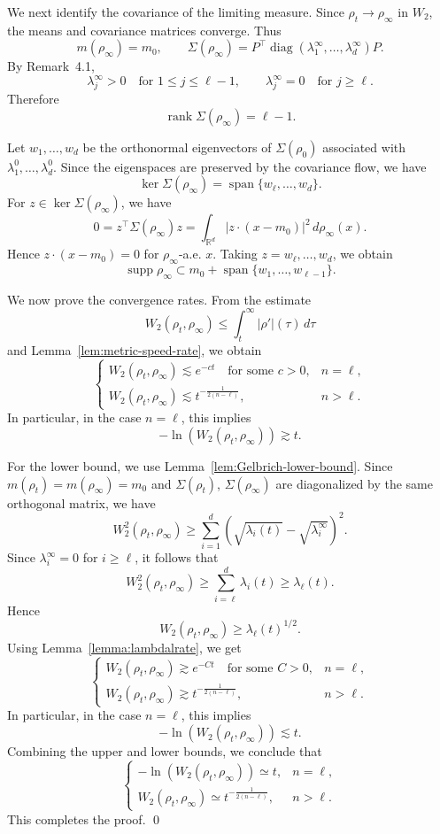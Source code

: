 \documentclass[11pt,reqno]{amsart}
\numberwithin{figure}{section}
\begin{document}
We next identify the covariance of the limiting measure. Since \(\rho_t\to\rho_\infty\)
in \(W_2\), the means and covariance matrices converge. Thus
\[
m(\rho_\infty)=m_0,
\qquad
\Sigma(\rho_\infty)
=
P^\top
\operatorname{diag}(\lambda_1^\infty,\dots,\lambda_d^\infty)P.
\]
By Remark~4.1,
\[
\lambda_j^\infty>0 \quad\text{for }1\le j\le \ell-1,
\qquad
\lambda_j^\infty=0 \quad\text{for }j\ge \ell.
\]
Therefore
\[
\operatorname{rank}\Sigma(\rho_\infty)=\ell-1.
\]

Let \(w_1,\dots,w_d\) be the orthonormal eigenvectors of \(\Sigma(\rho_0)\) associated with
\(\lambda_1^0,\dots,\lambda_d^0\). Since the eigenspaces are preserved by the covariance
flow, we have
\[
\ker\Sigma(\rho_\infty)
=
\operatorname{span}\{w_\ell,\dots,w_d\}.
\]
For \(z\in \ker\Sigma(\rho_\infty)\), we have
\[
0
=
z^\top\Sigma(\rho_\infty)z
=
\int_{\mathbb R^d}
|z\cdot(x-m_0)|^2\,d\rho_\infty(x).
\]
Hence \(z\cdot(x-m_0)=0\) for \(\rho_\infty\)-a.e. \(x\). Taking
\(z=w_\ell,\dots,w_d\), we obtain
\[
\operatorname{supp}\rho_\infty
\subset
m_0+\operatorname{span}\{w_1,\dots,w_{\ell-1}\}.
\]

We now prove the convergence rates. From the estimate
\[
W_2(\rho_t,\rho_\infty)
\le
\int_t^\infty |\rho'|(\tau)\,d\tau
\]
and Lemma~\ref{lem:metric-speed-rate}, we obtain
\[
\begin{cases}
W_2(\rho_t,\rho_\infty)\lesssim e^{-ct}
\quad\text{for some }c>0, & n=\ell,\\[1mm]
W_2(\rho_t,\rho_\infty)
\lesssim
t^{-\frac{1}{2(n-\ell)}}, & n>\ell.
\end{cases}
\]
In particular, in the case \(n=\ell\), this implies
\[
-\ln\left(W_2(\rho_t,\rho_\infty)\right)\gtrsim t.
\]

For the lower bound, we use Lemma~\ref{lem:Gelbrich-lower-bound}. Since
\(m(\rho_t)=m(\rho_\infty)=m_0\) and \(\Sigma(\rho_t)\), \(\Sigma(\rho_\infty)\) are
diagonalized by the same orthogonal matrix, we have
\[
W_2^2(\rho_t,\rho_\infty)
\ge
\sum_{i=1}^d
\left(\sqrt{\lambda_i(t)}-\sqrt{\lambda_i^\infty}\right)^2.
\]
Since \(\lambda_i^\infty=0\) for \(i\ge\ell\), it follows that
\[
W_2^2(\rho_t,\rho_\infty)
\ge
\sum_{i=\ell}^d \lambda_i(t)
\ge
\lambda_\ell(t).
\]
Hence
\[
W_2(\rho_t,\rho_\infty)
\ge
\lambda_\ell(t)^{1/2}.
\]
Using Lemma~\ref{lemma:lambdalrate}, we get
\[
\begin{cases}
W_2(\rho_t,\rho_\infty)\gtrsim e^{-Ct}
\quad\text{for some }C>0, & n=\ell,\\[1mm]
W_2(\rho_t,\rho_\infty)
\gtrsim
t^{-\frac{1}{2(n-\ell)}}, & n>\ell.
\end{cases}
\]
In particular, in the case \(n=\ell\), this implies
\[
-\ln\left(W_2(\rho_t,\rho_\infty)\right)\lesssim t.
\]
Combining the upper and lower bounds, we conclude that
\[
\begin{cases}
-\ln\left(W_2(\rho_t,\rho_\infty)\right)\simeq t, & n=\ell,\\[1mm]
W_2(\rho_t,\rho_\infty)\simeq t^{-\frac{1}{2(n-\ell)}}, & n>\ell.
\end{cases}
\]
This completes the proof.
\qed

 
 
\end{document}
